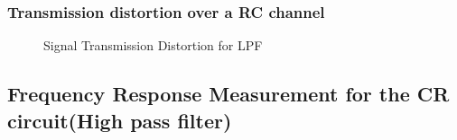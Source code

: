 \documentclass[a4paper, 12pt, english]{article}
\begin{document}
\subsubsection{Transmission distortion over a RC channel}
\begin{figure}[!ht]
	\centering
	\qquad
	\qquad
	\caption{Signal Transmission Distortion for LPF}
	\label{fig:STDLPF}
\end{figure}

\newpage
\subsection{Frequency Response Measurement for the CR circuit(High pass filter)}
\end{document}
